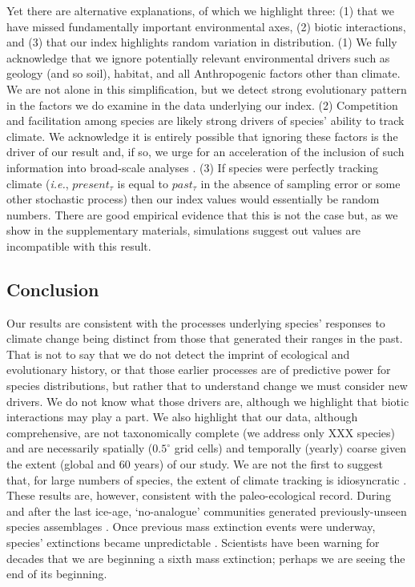 \documentclass[12pt]{report}
\begin{document}
Yet there are alternative
explanations, of which we highlight three: (1) that we have missed
fundamentally important environmental axes, (2) biotic interactions,
and (3) that our index highlights random variation in
distribution. (1) We fully acknowledge that we ignore potentially
relevant environmental drivers such as geology (and so soil), habitat,
and all Anthropogenic factors other than climate. We are not alone in
this simplification\supercite{xxx}, but we detect strong evolutionary
pattern in the factors we do examine in the data underlying our
index. (2) Competition and facilitation among species are likely
strong drivers of species' ability to track climate\supercite{xxx}. We
acknowledge it is entirely possible that ignoring these factors is the
driver of our result and, if so, we urge for an acceleration of the
inclusion of such information into broad-scale analyses
\supercite{xxx}. (3) If species were perfectly tracking climate
(\emph{i.e.}, $present_\tau$ is equal to $past_\tau$ in the absence of
sampling error or some other stochastic process) then our index values
would essentially be random numbers. There are good empirical evidence
that this is not the case \supercite{xxx} but, as we show in the
supplementary materials, simulations suggest out values are
incompatible with this result.

\subsection*{Conclusion}
Our results are consistent with the processes underlying species'
responses to climate change being distinct from those that generated
their ranges in the past. That is not to say that we do not detect the
imprint of ecological and evolutionary history, or that those earlier
processes are of predictive power for species distributions, but
rather that to understand change we must consider new drivers. We do
not know what those drivers are, although we highlight that biotic
interactions may play a part. We also highlight that our data,
although comprehensive, are not taxonomically complete (we address
only XXX species) and are necessarily spatially ($0.5^\circ$ grid
cells) and temporally (yearly) coarse given the extent (global and 60
years) of our study. We are not the first to suggest that, for large
numbers of species, the extent of climate tracking is idiosyncratic
\supercite{xxx}. These results are, however, consistent with the
paleo-ecological record. During and after the last ice-age,
`no-analogue' communities generated previously-unseen species
assemblages \supercite{xxx}. Once previous mass extinction events were
underway, species' extinctions became unpredictable
\supercite{xxx}. Scientists have been warning for decades that we are
beginning a sixth mass extinction;
perhaps we are seeing the end of its beginning.
\end{document}
